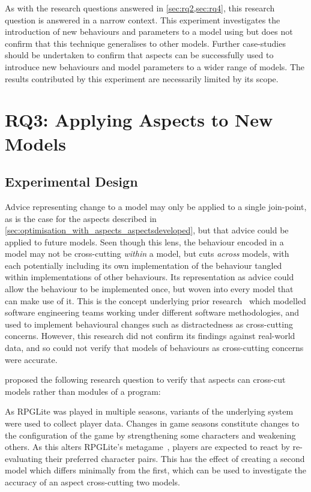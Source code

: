 As with the research questions answered in \cref{sec:rq2,sec:rq4}, this research
question is answered in a narrow context. This experiment investigates the
introduction of new behaviours and parameters to a model using \aop{} but does
not confirm that this technique generalises to other models. Further
case-studies should be undertaken to confirm that aspects can be successfully
used to introduce new behaviours and model parameters to a wider range of
models. The results contributed by this experiment are necessarily limited by
its scope.



\section{RQ3: Applying Aspects to New Models}
\label{sec:rq4}


\subsection{Experimental Design}

Advice representing change to a model may only be applied to a single
join-point, as is the case for the aspects described in
\cref{sec:optimisation_with_aspects_aspectsdeveloped}, but that advice could be
applied to future models. Seen though this lens, the behaviour encoded in a
model may not be cross-cutting \emph{within} a model, but cuts \emph{across}
models, with each potentially including its own implementation of the behaviour
tangled within implementations of other behaviours. Its representation as advice
could allow the behaviour to be implemented once, but woven into every model
that can make use of it. This is the concept underlying prior
research~\cite{wallis2018caise} which modelled software engineering teams
working under different software methodologies, and used \aop{} to implement
behavioural changes such as distractedness as cross-cutting concerns. However,
this research did not confirm its findings against real-world data, and so could
not verify that models of behaviours as cross-cutting concerns were accurate.

 proposed the following research question to verify that
aspects can cross-cut models rather than modules of a program:

\begin{researchquestion}
  \rqthree{}
\end{researchquestion}

As RPGLite was played in multiple seasons, variants of the underlying system
were used to collect player data. Changes in game seasons constitute changes to
the configuration of the game by strengthening some characters and weakening
others. As this alters RPGLite's metagame~\cite{kavanagh2021thesis}, players are
expected to react by re-evaluating their preferred character pairs. This has the
effect of creating a second model which differs minimally from the first, which
can be used to investigate the accuracy of an aspect cross-cutting two models.

